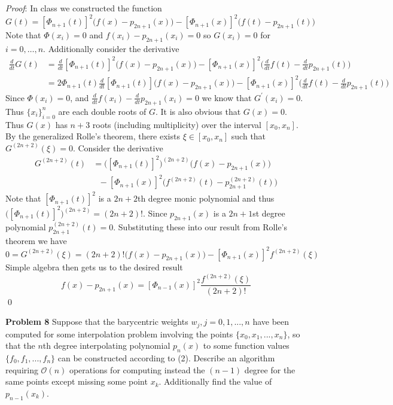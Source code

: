 \documentclass[12pt]{article}
\newcommand{\problem}[1]{\hspace{-4 ex} \large \textbf{Problem #1} }
\renewenvironment{proof}{\hspace{-4 ex} \emph{Proof}:}{\qed}
\begin{document}
	\begin{proof}
		In class we constructed the function
		$$
		G(t) = [\Phi_{n+1}(t)]^2 \Big( f(x) - p_{2n+1}(x) \Big) - [\Phi_{n+1}(x)]^2 \Big( f(t) - p_{2n+1}(t) \Big)
		$$
		Note that $\Phi(x_i) = 0$ and $f(x_i) - p_{2n+1}(x_i) = 0$ so $G(x_i)=0$ for $i=0, \dots, n$. Additionally consider the derivative
		\begin{align*}
			\frac{d}{dt}G(t) & = \frac{d}{dt} [\Phi_{n+1}(t)]^2 \Big( f(x) - p_{2n+1}(x) \Big) - [\Phi_{n+1}(x)]^2 \Big( \frac{d}{dt}f(t) - \frac{d}{dt}p_{2n+1}(t) \Big) \\
			& = 2\Phi_{n+1}(t) \frac{d}{dt} [\Phi_{n+1}(t)] \Big( f(x) - p_{2n+1}(x) \Big) - [\Phi_{n+1}(x)]^2 \Big( \frac{d}{dt}f(t) - \frac{d}{dt}p_{2n+1}(t) \Big)
		\end{align*}
		Since $\Phi(x_i) = 0$, and $\frac{d}{dt}f(x_i) - \frac{d}{dt}p_{2n+1}(x_i) = 0$ we know that $G^\prime(x_i) = 0$. Thus $\{x_i\}_{i=0}^n$ are each double roots of $G$. It is also obvious that $G(x) = 0$. Thus $G(x)$ has $n+3$ roots (including multiplicity) over the interval $[x_0,x_n]$. By the generalized Rolle's theorem, there exists $\xi \in [x_0,x_n]$ such that $G^{(2n+2)}(\xi) = 0$. Consider the derivative
		\begin{align*}
			G^{(2n+2)}(t) & = \Big( [\Phi_{n+1}(t)]^2 \Big)^{(2n+2)} \Big( f(x) - p_{2n+1}(x) \Big) \\
			& \text{\ \ \ } - [\Phi_{n+1}(x)]^2 \Big( f^{(2n+2)}(t) - p_{2n+1}^{(2n+2)}(t) \Big)	
		\end{align*}
		Note that $[\Phi_{n+1}(t)]^2$ is a $2n+2$th degree monic polynomial and thus \\
		$\Big( [\Phi_{n+1}(t)]^2 \Big)^{(2n+2)} = (2n+2)!$. Since $p_{2n+1}(x)$ is a $2n+1$st degree polynomial $p_{2n+1}^{(2n+2)}(t) = 0$. Substituting these into our result from Rolle's theorem we have
		$$
		0 = G^{(2n+2)}(\xi) = (2n+2)! \Big( f(x) - p_{2n+1}(x) \Big) - [\Phi_{n+1}(x)]^2 f^{(2n+2)}(\xi)
		$$
		Simple algebra then gets us to the desired result
		$$
		f(x) - p_{2n+1}(x) = [\Phi_{n-1}(x)]^2 \frac{f^{(2n+2)}(\xi)}{(2n+2)!}
		$$
	\end{proof}

\problem{8} Suppose that the barycentric weights $w_j , j = 0, 1, . . . , n$ have been computed for some interpolation problem involving the points $\{x_0, x_1, . . . , x_n\}$, so that the $n$th degree interpolating polynomial $p_n(x)$ to some function values $\{f_0, f_1, . . . , f_n\}$ can be constructed according to (2). Describe an algorithm requiring $\mathcal{O}(n)$ operations for computing instead the $(n-1)$ degree for the same points except missing some point $x_k$. Additionally find the value of $p_{n-1}(x_k)$. \bigbreak
\end{document}
